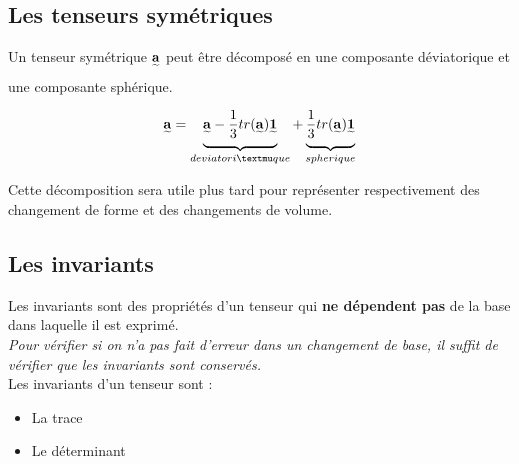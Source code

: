 \subsection{Les tenseurs symétriques}

Un tenseur symétrique $\mathbf{\underset{\widetilde{}}{a}}$ peut être décomposé en une composante déviatorique et une composante sphérique.


\begin{equation*}
    \mathbf{\undertilde{a}} = \underbrace{\mathbf{\undertilde{a}} - \frac{1}{3} tr(\mathbf{\undertilde{a}}) \mathbf{\undertilde{1}}}_{deviatoriµque} + \underbrace{\frac{1}{3} tr(\mathbf{\undertilde{a}})\mathbf{\undertilde{1}}}_{spherique}
\end{equation*}

Cette décomposition sera utile plus tard pour représenter respectivement des changement de forme et des changements de volume.

\subsection{Les invariants}

Les invariants sont des propriétés d'un tenseur qui \textbf{ne dépendent pas} de la base dans laquelle il est exprimé.\\

\textit{Pour vérifier si on n'a pas fait d'erreur dans un changement de base, il suffit de vérifier que les invariants sont conservés.}\\

Les invariants d'un tenseur sont : 
\begin{itemize}
    \item La trace 
    \item Le déterminant
\end{itemize}